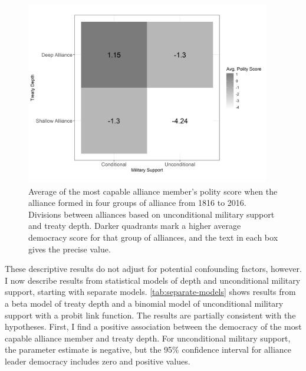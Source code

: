 \documentclass[12pt]{article}
\begin{document}
\begin{figure}[hbtp]
\centering
\includegraphics[width=0.95\textwidth]{../figures/democ-combo.png}
\caption{Average of the most capable alliance member's polity score when the alliance formed in four groups of alliance from 1816 to 2016. Divisions between alliances based on unconditional military support and treaty depth. Darker quadrants mark a higher average democracy score for that group of alliances, and the text in each box gives the precise value.}
\label{fig:democ-combo}
\end{figure}


These descriptive results do not adjust for potential confounding factors, however.
I now describe results from statistical models of depth and unconditional military support, starting with separate models. 
\autoref{tab:separate-models} shows results from a beta model of treaty depth and a binomial model of unconditional military support with a probit link function. 
The results are partially consistent with the hypotheses.
First, I find a positive association between the democracy of the most capable alliance member and treaty depth. 
For unconditional military support, the parameter estimate is negative, but the 95\% confidence interval for alliance leader democracy includes zero and positive values. 
\end{document}
